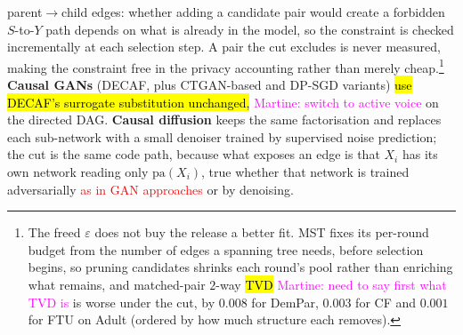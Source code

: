 \documentclass{article}
\newcommand{\martine}[1]{\textcolor{magenta}{Martine: #1}}
\begin{document}
parent$\rightarrow$child edges: whether adding a candidate pair would create
a forbidden $S$-to-$Y$ path depends on what is already in the model, so the
constraint is checked incrementally at each selection step. A pair the cut
excludes is never measured, making the constraint free in the privacy
accounting rather than merely cheap.\footnote{The freed $\varepsilon$ does
not buy the release a better fit. MST fixes its per-round budget from the
number of edges a spanning tree needs, before selection begins, so pruning
candidates shrinks each round's pool rather than enriching what remains, and
matched-pair $2$-way \hl{TVD} \martine{need to say first what TVD is} is worse under the cut, by $0.008$ for DemPar,
$0.003$ for CF and $0.001$ for FTU on Adult (ordered by how much structure
each removes).} \textbf{Causal GANs} (DECAF, plus CTGAN-based
\citep{xu2019ctgan} and DP-SGD \citep{abadi2016dpsgd} variants) \hl{use DECAF's
surrogate substitution unchanged,} \martine{switch to active voice} on the directed DAG. \textbf{Causal
diffusion} keeps the same factorisation and replaces each sub-network with a
small denoiser trained by supervised noise prediction; the cut is the same
code path, because what exposes an edge is that $X_i$ has its own network
reading only $\mathrm{pa}(X_i)$, true whether that network is trained
adversarially \textcolor{red}{as in GAN approaches} or by denoising.
\end{document}
